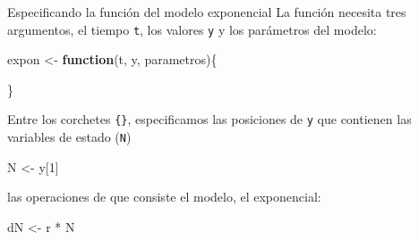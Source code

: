 \documentclass[
  11pt,
  ignorenonframetext,
]{beamer}
\newenvironment{Shaded}{}{}
\newcommand{\ControlFlowTok}[1]{\textcolor[rgb]{0.00,0.44,0.13}{\textbf{#1}}}
\newcommand{\DecValTok}[1]{\textcolor[rgb]{0.25,0.63,0.44}{#1}}
\newcommand{\NormalTok}[1]{#1}
\newcommand{\OtherTok}[1]{\textcolor[rgb]{0.00,0.44,0.13}{#1}}
\newcommand{\SpecialCharTok}[1]{\textcolor[rgb]{0.25,0.44,0.63}{#1}}
\begin{document}
\begin{frame}[fragile]{Especificando la función del modelo exponencial}
La función necesita tres argumentos, el tiempo \texttt{t}, los valores
\texttt{y} y los parámetros del modelo:

\begin{Shaded}
\begin{Highlighting}[]
\NormalTok{expon }\OtherTok{\textless{}{-}} \ControlFlowTok{function}\NormalTok{(t, y, parametros)\{}
  
\NormalTok{\}}
\end{Highlighting}
\end{Shaded}

Entre los corchetes \texttt{\{\}}, especificamos las posiciones de
\texttt{y} que contienen las variables de estado (\texttt{N})

\begin{Shaded}
\begin{Highlighting}[]
\NormalTok{N }\OtherTok{\textless{}{-}}\NormalTok{ y[}\DecValTok{1}\NormalTok{]}
\end{Highlighting}
\end{Shaded}

las operaciones de que consiste el modelo, el exponencial:

\begin{Shaded}
\begin{Highlighting}[]
\NormalTok{dN }\OtherTok{\textless{}{-}}\NormalTok{ r }\SpecialCharTok{*}\NormalTok{ N}
\end{Highlighting}
\end{Shaded}
\end{frame}
\end{document}
